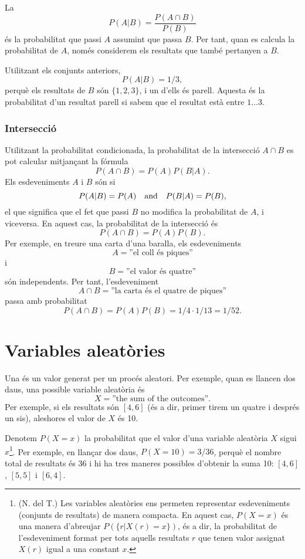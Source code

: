 
La 
\[P(A | B) = \frac{P(A \cap B)}{P(B)}\]
és la probabilitat que passi $A$ assumint que passa $B$. Per tant,
quan es calcula la probabilitat de $A$, només considerem els resultats
que també pertanyen a $B$.

Utilitzant els conjunts anteriors,
\[P(A | B)= 1/3,\]
perquè els resultats de $B$ són $\{1,2,3\}$, i un d'ells és
parell. Aquesta és la probabilitat d'un resultat parell si sabem que
el resultat està entre $1 \ldots 3$.

\subsubsection{Intersecció}


Utilitzant la probabilitat condicionada, la probabilitat de la
intersecció $A \cap B$ es pot calcular mitjançant la fórmula
\[P(A \cap B)=P(A)P(B|A).\]
Els esdeveniments $A$ i $B$ són  si
\[P(A|B)=P(A) \hspace{10px}\textrm{and}\hspace{10px} P(B|A)=P(B),\]
el que significa que el fet que passi $B$ no modifica la probabilitat
de $A$, i viceversa. En aquest cas, la probabilitat de la intersecció
és
\[P(A \cap B)=P(A)P(B).\]
Per exemple, en treure una carta d'una baralla, els esdeveniments
\[A = \textrm{''el coll és piques''}\]
i
\[B = \textrm{''el valor és quatre''}\]
són independents. Per tant, l'esdeveniment
\[A \cap B = \textrm{''la carta és el quatre de piques''}\]
passa amb probabilitat
\[P(A \cap B)=P(A)P(B)=1/4 \cdot 1/13 = 1/52.\]

\section{Variables aleatòries}


Una  és un valor generat per un procés
aleatori. Per exemple, quan es llancen dos daus, una possible variable
aleatòria és
\[X=\textrm{''the sum of the outcomes''}.\]
Per exemple, si els resultats són $[4,6]$ (és a dir, primer tirem un
quatre i després un sis), aleshores el valor de $X$ és 10.

Denotem $P(X=x)$ la probabilitat que el valor d'una variable aleatòria
$X$ sigui $x$\footnote{(N. del T.) Les variables aleatòries ens
permeten representar esdeveniments (conjunts de resultats) de manera
compacta. En aquest cas, $P(X=x)$ és una manera d'abreujar $P(\{r |
X(r)=x\})$, és a dir, la probabilitat de l'esdeveniment format per
tots aquells resultats $r$ que tenen valor assignat $X(r)$ igual a una
constant $x$.}. Per exemple, en llançar dos daus, $P(X=10)=3/36$,
perquè el nombre total de resultats és 36 i hi ha tres maneres
possibles d'obtenir la suma 10: $[4,6]$, $[5,5]$ i $[6,4]$.

